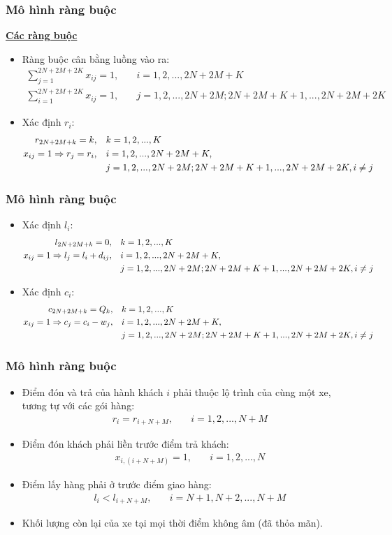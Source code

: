 \documentclass{beamer}
\begin{document}
	\begin{frame}
		\frametitle{Mô hình ràng buộc}
		\textbf{\underline{Các ràng buộc}}
		\begin{itemize}
			\item Ràng buộc cân bằng luồng vào ra:
			\begin{align}
				\sum_{j=1}^{2N+2M+2K} x_{ij} = 1,\quad & i=1,2,...,2N+2M+K \\
				\sum_{i=1}^{2N+2M+2K} x_{ij} = 1,\quad & j=1,2,...,2N+2M;2N+2M+K+1,...,2N+2M+2K
			\end{align}
			\item Xác định $r_i$:
			\begin{align}
				r_{2N+2M+k} = k,\quad & k=1,2,...,K \\
				x_{ij}=1\Rightarrow r_j=r_i,\quad & i=1,2,...,2N+2M+K, \\
				& j=1,2,...,2N+2M;2N+2M+K+1,...,2N+2M+2K, i\ne j \notag
			\end{align}
		\end{itemize}
	\end{frame}
	\begin{frame}
		\frametitle{Mô hình ràng buộc}
		\begin{itemize}
			\item Xác định $l_i$:
			\begin{align}
				l_{2N+2M+k} = 0,\quad & k=1,2,...,K \\
				x_{ij}=1\Rightarrow l_j=l_i + d_{ij},\quad & i=1,2,...,2N+2M+K, \\
				& j=1,2,...,2N+2M;2N+2M+K+1,...,2N+2M+2K,i\ne j \notag
			\end{align}
			\item Xác định $c_i$:
			\begin{align}
				c_{2N+2M+k} = Q_k,\quad & k=1,2,...,K \\
				x_{ij}=1\Rightarrow c_j=c_i - w_j,\quad & i=1,2,...,2N+2M+K, \\
				& j=1,2,...,2N+2M;2N+2M+K+1,...,2N+2M+2K,i\ne j \notag
			\end{align}
		\end{itemize}
	\end{frame}
	\begin{frame}
		\frametitle{Mô hình ràng buộc}
		\begin{itemize}
			\item Điểm đón và trả của hành khách $i$ phải thuộc lộ trình của cùng một xe, tương tự với các gói hàng:
			\begin{align}
				r_i = r_{i+N+M},\quad & i=1,2,...,N+M
			\end{align}
			\item Điểm đón khách phải liền trước điểm trả khách:
			\begin{align}
				x_{i,(i+N+M)} = 1,\quad & i=1,2,...,N
			\end{align}
			\item Điểm lấy hàng phải ở trước điểm giao hàng:
			\begin{align}
				l_i < l_{i+N+M},\quad & i=N+1,N+2,...,N+M
			\end{align}
			\item Khối lượng còn lại của xe tại mọi thời điểm không âm (đã thỏa mãn).
		\end{itemize}
	\end{frame}
\end{document}
